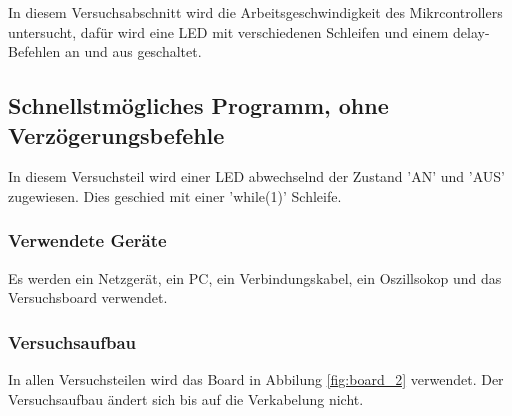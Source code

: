 \documentclass[12pt,a4paper]{article}
\begin{document}
In diesem Versuchsabschnitt wird die Arbeitsgeschwindigkeit des Mikrcontrollers untersucht, dafür wird eine LED mit verschiedenen Schleifen und einem delay-Befehlen an und aus geschaltet.

\subsection{Schnellstmögliches Programm, ohne Verzögerungsbefehle}

In diesem Versuchsteil wird einer LED abwechselnd der Zustand 'AN' und 'AUS' zugewiesen. Dies geschied mit einer 'while(1)' Schleife.

\subsubsection*{Verwendete Geräte}

Es werden ein Netzgerät, ein PC, ein Verbindungskabel, ein Oszillsokop und das Versuchsboard verwendet.

\subsubsection*{Versuchsaufbau}

In allen Versuchsteilen wird das Board in Abbilung \ref{fig:board_2} verwendet. Der Versuchsaufbau ändert sich bis auf die Verkabelung nicht.
\end{document}
